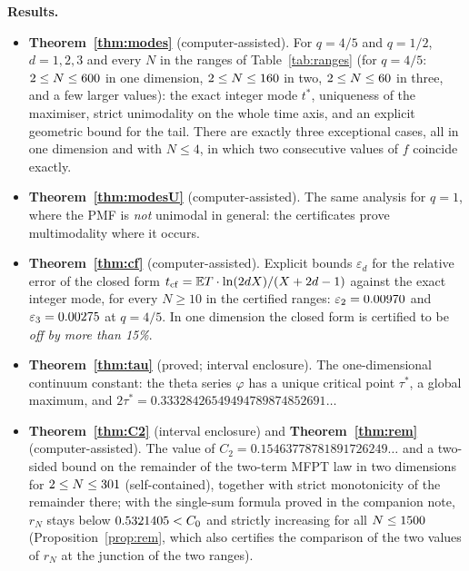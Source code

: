 \documentclass[11pt,a4paper]{article}
\theoremstyle{definition}
\theoremstyle{remark}
\begin{document}
\textbf{Results.}
\begin{itemize}
\item \textbf{Theorem~\ref{thm:modes}} (computer-assisted). For $q=4/5$ and $q=1/2$, $d=1,2,3$ and every $N$ in the ranges of Table~\ref{tab:ranges} (for $q=4/5$: $2\le N\le600$ in one dimension, $2\le N\le160$ in two, $2\le N\le60$ in three, and a few larger values): the exact integer mode $t^*$, uniqueness of the maximiser, strict unimodality on the whole time axis, and an explicit geometric bound for the tail. There are exactly three exceptional cases, all in one dimension and with $N\le4$, in which two consecutive values of $f$ coincide exactly.
\item \textbf{Theorem~\ref{thm:modesU}} (computer-assisted). The same analysis for $q=1$, where the PMF is \emph{not} unimodal in general: the certificates prove multimodality where it occurs.
\item \textbf{Theorem~\ref{thm:cf}} (computer-assisted). Explicit bounds $\varepsilon_d$ for the relative error of the closed form $t_{\rm cf}=\mathbb E T\cdot\ln(2dX)/(X+2d-1)$ against the exact integer mode, for every $N\ge 10$ in the certified ranges: $\varepsilon_2=0.00970$ and $\varepsilon_3=0.00275$ at $q=4/5$. In one dimension the closed form is certified to be \emph{off by more than 15\%}.
\item \textbf{Theorem~\ref{thm:tau}} (proved; interval enclosure). The one-dimensional continuum constant: the theta series $\varphi$ has a unique critical point $\tau^*$, a global maximum, and $2\tau^*=0.33328426549494789874852691\ldots$
\item \textbf{Theorem~\ref{thm:C2}} (interval enclosure) and \textbf{Theorem~\ref{thm:rem}} (computer-assisted). The value of $C_2=0.15463778781891726249\ldots$ and a two-sided bound on the remainder of the two-term MFPT law in two dimensions for $2\le N\le 301$ (self-contained), together with strict monotonicity of the remainder there; with the single-sum formula proved in the companion note, $r_N$ stays below $0.5321405<C_0$ and strictly increasing for all $N\le 1500$ (Proposition~\ref{prop:rem}, which also certifies the comparison of the two values of $r_N$ at the junction of the two ranges).

\end{itemize}
\end{document}
